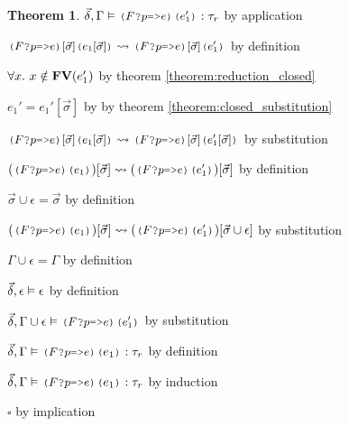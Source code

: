 \documentclass[acmsmall]{acmart}
\theoremstyle{definition}
\newtheorem{theorem}{Theorem}[section]
\begin{document}
\begin{theorem}
      \item \Z\Z $\vec{\delta}, \Gamma \satisfies \J{($F$?$p$=>$e$)($e_1'$)} \hastype \tau_r$ by application
      \item \Z\Z $\J{($F$?$p$=>$e$)$[\vec{\sigma}]$($e_1[\vec{\sigma}]$)} \rightsquigarrow \J{($F$?$p$=>$e$)$[\vec{\sigma}]$($e_1'$)}$ by definition 
      \item \Z\Z $\forall x .\ x \notin \textbf{FV}(e_1')$ by theorem \ref{theorem:reduction_closed} 
      \item \Z\Z $e_1' = e_1'[\vec{\sigma}]$ by by theorem \ref{theorem:closed_substitution} 
      \item \Z\Z $\J{($F$?$p$=>$e$)$[\vec{\sigma}]$($e_1[\vec{\sigma}]$)} \rightsquigarrow \J{($F$?$p$=>$e$)$[\vec{\sigma}]$($e_1'[\vec{\sigma}]$)}$ by substitution 
      \item \Z\Z $(\J{($F$?$p$=>$e$)($e_1$)})[\vec{\sigma}] \rightsquigarrow (\J{($F$?$p$=>$e$)($e_1'$)})[\vec{\sigma}]$ by definition 
      \item \Z\Z $\vec{\sigma} \cup \epsilon = \vec{\sigma}$ by definition 
      \item \Z\Z $(\J{($F$?$p$=>$e$)($e_1$)})[\vec{\sigma}] \rightsquigarrow (\J{($F$?$p$=>$e$)($e_1'$)})[\vec{\sigma} \cup \epsilon]$ by substitution 
      \item \Z\Z $\Gamma \cup \epsilon = \Gamma$ by definition
      \item \Z\Z $\vec{\delta}, \epsilon \vDash \epsilon$ by definition
      \item \Z\Z $\vec{\delta}, \Gamma \cup \epsilon \satisfies \J{($F$?$p$=>$e$)($e_1'$)}$ by substitution 
      \item \Z\Z $\vec{\delta}, \Gamma \satisfies \J{($F$?$p$=>$e$)}\J{(}e_1\J{)} \hastype \tau_r$ by definition
    \item \Z $\vec{\delta}, \Gamma \satisfies \J{($F$?$p$=>$e$)}\J{(}e_1\J{)} \hastype \tau_r$ by induction
  \item $\square$ by implication 
\end{theorem}
\end{document}
